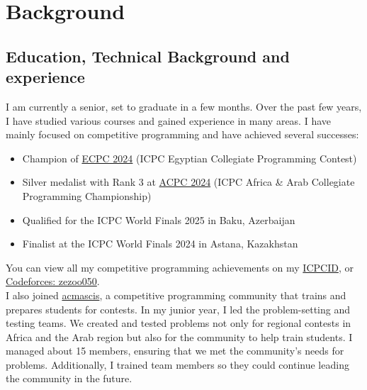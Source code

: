 \section{Background}


\subsection{Education, Technical Background and experience}
I am currently a senior, set to graduate in a few months. Over the past few
years, I have studied various courses and gained experience in many areas. I
have mainly focused on competitive programming and have achieved several
successes:
\begin{itemize}
      \item Champion of
            \href{https://icpc.global/regionals/finder/ECPC-2025/standings}{ECPC 2024}
            (ICPC Egyptian Collegiate Programming Contest)
      \item Silver medalist with Rank 3 at
            \href{https://icpc.global/regionals/finder/ACPC-2025/standings}{ACPC 2024}
            (ICPC Africa \& Arab Collegiate Programming Championship)
      \item Qualified for the ICPC World Finals 2025 in Baku, Azerbaijan
      \item Finalist at the ICPC World Finals 2024 in Astana, Kazakhstan
\end{itemize}

You can view all my competitive programming achievements on my
\href{https://icpc.global/ICPCID/FRKWA0PTZMC8}{ICPCID}, or
\href{https://codeforces.com/profile/zezoo050}{Codeforces: zezoo050}.\\

I also joined \href{https://www.facebook.com/acmASCIS}{acmascis}, a competitive
programming community that trains and prepares students for contests. In my
junior year, I led the problem-setting and testing teams. We created and tested
problems not only for regional contests in Africa and the Arab region but also
for the community to help train students. I managed about 15 members, ensuring
that we met the community’s needs for problems. Additionally, I trained team
members so they could continue leading the community in the future.\\

